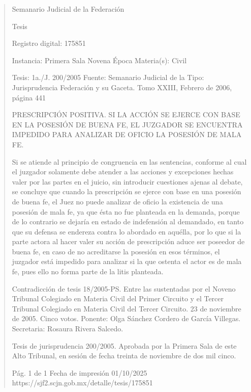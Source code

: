 \documentclass[11pt,a4paper]{article}
\begin{document}
\begin{quote}
                                                   Semanario Judicial de la Federación

                                                  Tesis

 Registro digital: 175851

 Instancia: Primera Sala          Novena Época                          Materia(s): Civil

 Tesis: 1a./J. 200/2005           Fuente: Semanario Judicial de la      Tipo: Jurisprudencia
                                  Federación y su Gaceta.
                                  Tomo XXIII, Febrero de 2006,
                                  página 441


PRESCRIPCIÓN POSITIVA. SI LA ACCIÓN SE EJERCE CON BASE EN LA POSESIÓN DE
BUENA FE, EL JUZGADOR SE ENCUENTRA IMPEDIDO PARA ANALIZAR DE OFICIO LA
POSESIÓN DE MALA FE.


Si se atiende al principio de congruencia en las sentencias, conforme al cual el juzgador solamente
debe atender a las acciones y excepciones hechas valer por las partes en el juicio, sin introducir
cuestiones ajenas al debate, se concluye que cuando la prescripción se ejerce con base en una
posesión de buena fe, el Juez no puede analizar de oficio la existencia de una posesión de mala fe,
ya que ésta no fue planteada en la demanda, porque de lo contrario se dejaría en estado de
indefensión al demandado, en tanto que su defensa se endereza contra lo abordado en aquélla, por
lo que si la parte actora al hacer valer su acción de prescripción aduce ser poseedor de buena fe, en
caso de no acreditarse la posesión en esos términos, el juzgador está impedido para analizar si la
que ostenta el actor es de mala fe, pues ello no forma parte de la litis planteada.


Contradicción de tesis 18/2005-PS. Entre las sustentadas por el Noveno Tribunal Colegiado en
Materia Civil del Primer Circuito y el Tercer Tribunal Colegiado en Materia Civil del Tercer Circuito.
23 de noviembre de 2005. Cinco votos. Ponente: Olga Sánchez Cordero de García Villegas.
Secretaria: Rosaura Rivera Salcedo.

Tesis de jurisprudencia 200/2005. Aprobada por la Primera Sala de este Alto Tribunal, en sesión de
fecha treinta de noviembre de dos mil cinco.




                                             Pág. 1 de 1             Fecha de impresión 01/10/2025
  https://sjf2.scjn.gob.mx/detalle/tesis/175851

\end{quote}
\end{document}

